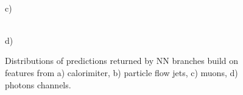 \documentclass[a4paper]{jpconf}
\begin{document}
\begin{figure}[H]
\begin{minipage}[h!]{0.4\linewidth}
\end{minipage}
\vfill
\begin{minipage}[h!]{0.4\linewidth}
\\ c) 
\end{minipage}
\hfill
\begin{minipage}[h!]{0.4\linewidth}
 \\ d) 
\end{minipage}
\caption{\label{fig:predictions} Distributions of predictions returned by NN branches build on features from a) calorimiter, b) particle flow jets, c) muons, d) photons
channels.}
\end{figure}
\end{document}
